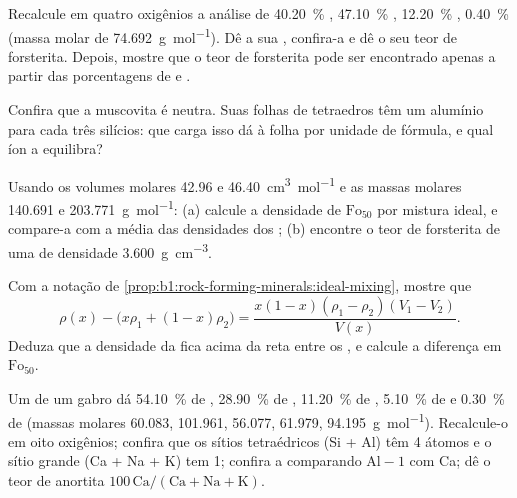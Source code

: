 \begin{exercise}[$\star\star$]\label{exo:b1:rock-forming-minerals:7}
Recalcule em quatro oxigênios a análise de  \qty{40.20}{\percent}
, \qty{47.10}{\percent} , \qty{12.20}{\percent} ,
\qty{0.40}{\percent}  (massa molar de 
\qty{74.692}{g.mol^{-1}}).
Dê a sua , confira-a e dê o seu teor de forsterita. Depois, mostre que o teor de forsterita pode ser encontrado apenas a partir das porcentagens de  e
.
\end{exercise}

\begin{exercise}[$\star\star$]\label{exo:b1:rock-forming-minerals:8}
Confira que a muscovita  é neutra. Suas folhas de tetraedros têm um alumínio para cada três silícios: que carga isso dá à folha por unidade de fórmula, e qual íon a equilibra?
\end{exercise}

\begin{exercise}[$\star\star$]\label{exo:b1:rock-forming-minerals:9}
Usando os volumes molares \num{42.96} e \qty{46.40}{cm^3.mol^{-1}} e as massas molares \num{140.691} e \qty{203.771}{g.mol^{-1}}: (a) calcule a densidade de $\text{Fo}_{50}$ por mistura ideal, e compare-a com a média das densidades dos ; (b) encontre o teor de forsterita de uma  de densidade \qty{3.600}{g.cm^{-3}}.
\end{exercise}

\begin{exercise}[$\star\star\star$]\label{exo:b1:rock-forming-minerals:10}
Com a notação de \cref{prop:b1:rock-forming-minerals:ideal-mixing}, mostre
que
\[
  \rho(x) - \bigl(x\rho_1 + (1 - x)\rho_2\bigr) =
  \frac{x(1 - x)(\rho_1 - \rho_2)(V_1 - V_2)}{V(x)} .
\]
Deduza que a densidade da  fica acima da reta entre os , e calcule a diferença em $\text{Fo}_{50}$.
\end{exercise}

\begin{exercise}[$\star\star\star$]\label{exo:b1:rock-forming-minerals:11}
Um  de um gabro dá \qty{54.10}{\percent} de ,
\qty{28.90}{\percent} de , \qty{11.20}{\percent} de ,
\qty{5.10}{\percent} de  e \qty{0.30}{\percent} de  (massas molares \num{60.083}, \num{101.961}, \num{56.077}, \num{61.979},
\qty{94.195}{g.mol^{-1}}). Recalcule-o em oito oxigênios; confira que os sítios tetraédricos (Si + Al) têm 4 átomos e o sítio grande
(Ca + Na + K) tem 1; confira a  comparando $\mathrm{Al} - 1$
com Ca; dê o teor de anortita $100\,\mathrm{Ca}/(\mathrm{Ca} +
\mathrm{Na} + \mathrm{K})$.
\end{exercise}

